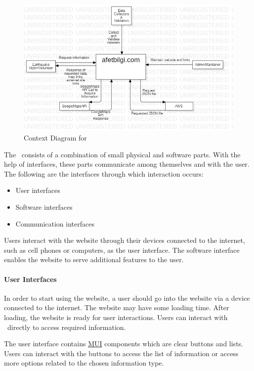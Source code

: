 \begin{figure}[H]
  \centering
  \includegraphics[width=\linewidth]{img/context-diagram.jpg}
  \caption{Context Diagram for \afetbilgi}
\end{figure}

The \afetbilgi\ consists of a combination of small physical and software parts. With the help of interfaces, these parts communicate among themselves and with the user. The following are the interfaces through which interaction occurs:
\begin{itemize}
  \item User interfaces
  \item Software interfaces
  \item Communication interfaces
\end{itemize}
Users interact with the website through their devices connected to the internet, such as cell phones or computers, as the user interface. The software interface enables the website to serve additional features to the user.

\paragraph{User Interfaces}

In order to start using the website, a user should go into the website via a device connected to the internet. The website may have some loading time. After loading, the website is ready for user interactions. Users can interact with \afetbilgi\ directly to access required information.

The user interface contains \href{https://mui.com/}{MUI} components which are clear buttons and lists. Users can interact with the buttons to access the list of information or access more options related to the chosen information type.

